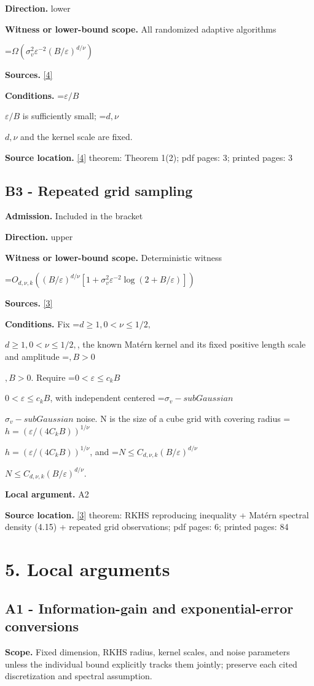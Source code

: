 \documentclass[10pt,a4paper]{article}
\newcommand{\AtlasMath}[1]{\par\begingroup\centering\setbox0=\hbox{$\displaystyle #1$}\ifdim\wd0>1.4\linewidth\typeout{ATLAS WIDE FORMULA: \the\wd0}\fi\ifdim\wd0>\linewidth\resizebox{\linewidth}{!}{\box0}\else\box0\fi\par\endgroup}
\newcommand{\AtlasInlineMath}[1]{\begingroup\setbox0=\hbox{$#1$}\ifdim\wd0>.4\linewidth\endgroup\AtlasMath{#1}\else\endgroup$#1$\fi}
\begin{document}
\textbf{Direction.} lower

\textbf{Witness or lower-bound scope.} All randomized adaptive algorithms

\AtlasMath{\Omega\!\left(\sigma_v^2\varepsilon^{-2}(B/\varepsilon)^{d/\nu}\right)}
\textbf{Sources.} \href{https://proceedings.mlr.press/v65/scarlett17a/scarlett17a.pdf}{[4]}

\textbf{Conditions.} \AtlasInlineMath{\varepsilon/B} is sufficiently small; \AtlasInlineMath{d,\nu} and the kernel scale are fixed.

\textbf{Source location.} \href{https://proceedings.mlr.press/v65/scarlett17a/scarlett17a.pdf}{[4]} theorem: Theorem 1(2); pdf pages: 3; printed pages: 3

\subsection{B3 - Repeated grid sampling}
\textbf{Admission.} Included in the bracket

\textbf{Direction.} upper

\textbf{Witness or lower-bound scope.} Deterministic witness

\AtlasMath{O_{d,\nu,k}\!\left((B/\varepsilon)^{d/\nu}\left[1+\sigma_v^2\varepsilon^{-2}\log(2+B/\varepsilon)\right]\right)}
\textbf{Sources.} \href{https://gaussianprocess.org/gpml/chapters/RW4.pdf}{[3]}

\textbf{Conditions.} Fix \AtlasInlineMath{d\ge 1,0<\nu \le 1/2,}, the known Matérn kernel and its fixed positive length scale and amplitude \AtlasInlineMath{,B>0}. Require \AtlasInlineMath{0<\varepsilon \le c_k B}, with independent centered \AtlasInlineMath{\sigma_v -subGaussian} noise. N is the size of a cube grid with covering radius \AtlasInlineMath{h=(\varepsilon /(4C_k B))^{1/\nu }}, and \AtlasInlineMath{N\le C_{d,\nu ,k}(B/\varepsilon )^{d/\nu }}.

\textbf{Local argument.} A2

\textbf{Source location.} \href{https://gaussianprocess.org/gpml/chapters/RW4.pdf}{[3]} theorem: RKHS reproducing inequality + Matérn spectral density (4.15) + repeated grid observations; pdf pages: 6; printed pages: 84

\section{5. Local arguments}
\subsection{A1 - Information-gain and exponential-error conversions}
\textbf{Scope.} Fixed dimension, RKHS radius, kernel scales, and noise parameters unless the individual bound explicitly tracks them jointly; preserve each cited discretization and spectral assumption.
\end{document}
